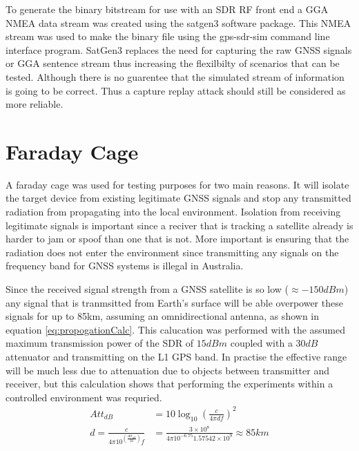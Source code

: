 To generate the binary bitstream for use with an SDR RF front end a GGA NMEA data stream was created using the satgen3 software package. This NMEA stream was used to make
the binary file using the gps-sdr-sim command line interface program. SatGen3 replaces the need for capturing the raw GNSS signals or GGA sentence stream thus increasing
the flexilbilty of scenarios that can be tested. Although there is no guarentee that the simulated stream of information is going to be correct. Thus a capture replay
attack should still be considered as more reliable.

\section{Faraday Cage}
A faraday cage was used for testing purposes for two main reasons. It will isolate the target device from existing legitimate GNSS signals and stop any transmitted
radiation from propagating into the local environment. Isolation from receiving legitimate signals is important since a reciver that is tracking a satellite already is
harder to jam or spoof than one that is not. More important is ensuring that the radiation does not enter the environment since transmitting any signals on the frequency
band for GNSS systems is illegal in Australia. 

Since the received signal strength from a GNSS satellite is so low ($\approx -150dBm$) any signal that is tranmsitted from Earth's surface will be able overpower these
signals for up to 85km, assuming an omnidirectional antenna, as shown in equation \ref{eq:propogationCalc}. This calucation was performed with the assumed maximum
transmission power of the SDR of $15 dBm$ coupled with a $30dB$ attenuator and transmitting on the L1 GPS band. In practise the effective range will be much less due to
attenuation due to objects between transmitter and receiver, but this calculation shows that performing the experiments within a controlled environment was requried.
\begin{equation}    
    \begin{split} \label{eq:propogationCalc}
        Att_{dB} &= 10 \log_{10}\left(\frac{c}{4\pi df}\right)^2 \\
        d = \frac{c}{4\pi 10^{\left(\frac{Att_{dB}}{20}\right)}f} &= \frac{3\times10^8}{4\pi 10^{-6.75}1.57542\times 10^9} \approx 85km
    \end{split}
\end{equation}

